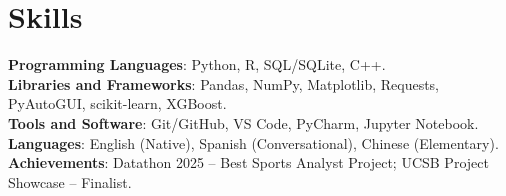 \documentclass[letterpaper,11pt]{article}
\begin{document}
\section{Skills}
 \begin{itemize}[leftmargin=0.15in, label={}]
    \small{\item{
     \textbf{Programming Languages}{: Python, R, SQL/SQLite, C++.} \\
     \textbf{Libraries and Frameworks}{: Pandas, NumPy, Matplotlib, Requests, PyAutoGUI, scikit-learn, XGBoost.} \\
     \textbf{Tools and Software}{: Git/GitHub, VS Code, PyCharm, Jupyter Notebook.} \\
     \textbf{Languages}{: English (Native), Spanish (Conversational), Chinese (Elementary).} \\
     \textbf{Achievements}{: Datathon 2025 -- Best Sports Analyst Project; UCSB Project Showcase -- Finalist.}
    }}
 \end{itemize}
\end{document}
